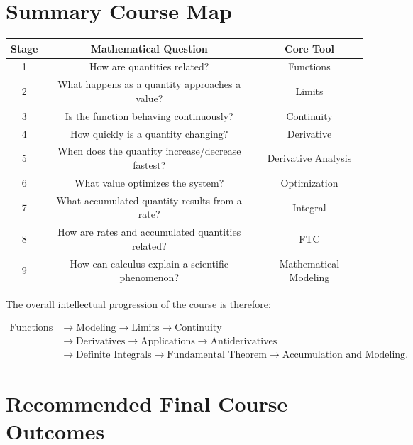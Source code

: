 \documentclass[11pt]{article}
\begin{document}
\section{Summary Course Map}

\begin{center}
\renewcommand{\arraystretch}{1.5}
\begin{tabular}{c|c|c}
\toprule
\textbf{Stage} & \textbf{Mathematical Question} & \textbf{Core Tool} \\
\midrule
1 & How are quantities related? & Functions \\
2 & What happens as a quantity approaches a value? & Limits \\
3 & Is the function behaving continuously? & Continuity \\
4 & How quickly is a quantity changing? & Derivative \\
5 & When does the quantity increase/decrease fastest? & Derivative Analysis \\
6 & What value optimizes the system? & Optimization \\
7 & What accumulated quantity results from a rate? & Integral \\
8 & How are rates and accumulated quantities related? & FTC \\
9 & How can calculus explain a scientific phenomenon? & Mathematical Modeling \\
\bottomrule
\end{tabular}
\end{center}

\vspace{0.5cm}

The overall intellectual progression of the course is therefore:

\[
\boxed{
\begin{aligned}
\text{Functions}
&\rightarrow
\text{Modeling}
\rightarrow
\text{Limits}
\rightarrow
\text{Continuity}
\\
&\rightarrow
\text{Derivatives}
\rightarrow
\text{Applications}
\rightarrow
\text{Antiderivatives}
\\
&\rightarrow
\text{Definite Integrals}
\rightarrow
\text{Fundamental Theorem}
\rightarrow
\text{Accumulation and Modeling}.
\end{aligned}
}
\]

\section{Recommended Final Course Outcomes}
\end{document}
